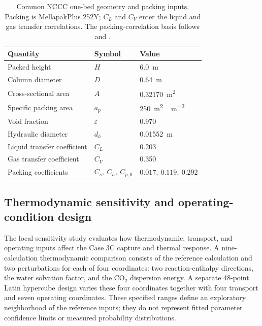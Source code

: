 \begin{table}[pos=htbp]
\centering\small
\caption{Common NCCC one-bed geometry and packing inputs. Packing is MellapakPlus 252Y; $C_L$ and $C_V$ enter the liquid and gas transfer correlations. The packing-correlation basis follows \citet{Chinen2018} and \citet{Billet1999}.}
\label{tab:common-column-inputs}
\begin{tabular}{@{}lll@{}}
\toprule
Quantity & Symbol & Value\\
\midrule
Packed height & $H$ & \qty{6.0}{m}\\
Column diameter & $D$ & \qty{0.64}{m}\\
Cross-sectional area & $A$ & \qty{0.32170}{m^2}\\
Specific packing area & $a_p$ & \qty{250}{m^2\,m^{-3}}\\
Void fraction & $\varepsilon$ & 0.970\\
Hydraulic diameter & $d_h$ & \qty{0.01552}{m}\\
Liquid transfer coefficient & $C_L$ & 0.203\\
Gas transfer coefficient & $C_V$ & 0.350\\
Packing coefficients & $C_s,\ C_h,\ C_{p,0}$ & $0.017,\ 0.119,\ 0.292$\\
\bottomrule
\end{tabular}
\end{table}


\subsection{Thermodynamic sensitivity and operating-condition design}\label{subsec:sensitivity-design}
The local sensitivity study evaluates how thermodynamic, transport, and operating inputs affect the Case 3C capture and thermal response.
A nine-calculation thermodynamic comparison consists of the reference calculation and two perturbations for each of four coordinates: two reaction-enthalpy directions, the water solvation factor, and the CO$_2$ dispersion energy.
A separate 48-point Latin hypercube design varies these four coordinates together with four transport and seven operating coordinates.
These specified ranges define an exploratory neighborhood of the reference inputs; they do not represent fitted parameter confidence limits or measured probability distributions.

